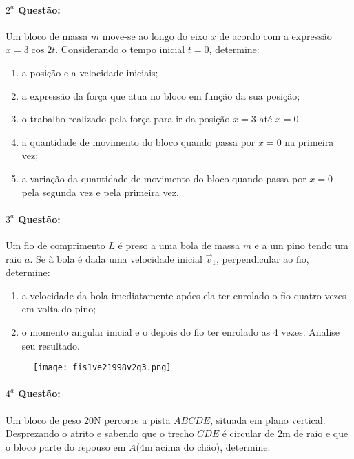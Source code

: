 \documentclass[12pt,a4paper]{article}
\begin{document}
\paragraph{$2^a$ Questão:}

Um bloco de massa $m$ move-se ao longo do eixo $x$ de acordo com a expressão $x=3\cos{2t}$. Considerando o tempo inicial $t=0$, determine:

\begin{enumerate}[label=\alph*)]
\item a posição e a velocidade iniciais;
\item a expressão da força que atua no bloco em função da sua posição;
\item o trabalho realizado pela força para ir da posição $x=3$ até $x=0$.
\item a quantidade de movimento do bloco quando passa por $x=0$ na primeira vez;
\item a variação da quantidade de movimento do bloco quando passa por $x=0$ pela segunda vez e pela primeira vez.
\end{enumerate}

\paragraph{$3^a$ Questão:}

Um fio de comprimento $L$ é preso a uma bola de massa $m$ e a um pino tendo um raio $a$. Se à bola é dada uma velocidade inicial
$\overrightarrow{v}_1$, perpendicular ao fio, determine:
\begin{enumerate}[label=\alph*)]
\item a velocidade da bola imediatamente apóes ela ter enrolado o fio quatro vezes em volta do pino;
\item o momento angular inicial e o depois do fio ter enrolado as 4 vezes. Analise seu resultado.
\end{enumerate}

\begin{figure}[ht]
\centering
\texttt{[image: fis1ve21998v2q3.png]}
\end{figure}

\paragraph{$4^a$ Questão:}

Um bloco de peso $20$N percorre a pista $ABCDE$, situada em plano vertical. Desprezando o atrito e sabendo que o trecho $CDE$ é circular de $2$m de raio
e que o bloco parte do repouso em $A$($4$m acima do chão), determine:
\end{document}

